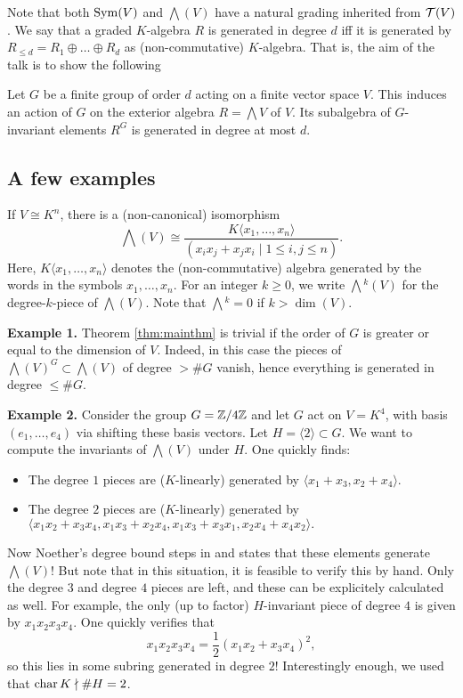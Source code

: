 \documentclass[../main.tex]{subfiles}
\begin{document}
Note that both $\operatorname{Sym}(V)$ and $\bigwedge(V)$ have a natural grading inherited from
$\mathcal{T}(V)$. 
We say that a graded $K$-algebra $R$ is generated in degree $d$ iff it is
generated by $R_{\leq d} = R_1 \oplus \dots \oplus R_d$ as (non-commutative)
$K$-algebra.  That is, the aim of the talk is to show the following 
\begin{thm}\label{thm:mainthm}
    Let $G$ be a finite group of order $d$ acting on a finite vector space $V$.
    This induces an action of $G$ on the exterior algebra $R = \bigwedge V$ of $V$.
    Its subalgebra of $G$-invariant elements $R^G$ is generated in
    degree at most $d$.
\end{thm}

\subsection{A few examples} %
\label{sub:Some examples}
If $V \cong K^n$, there is a (non-canonical) isomorphism
\begin{equation*}
    \bigwedge(V) \cong \frac{K\langle x_1, \dots, x_n \rangle}{(x_i x_j + x_j
    x_i \mid 1 \leq i,j \leq n)}.
\end{equation*}
Here, $K\langle x_1, \dots, x_n \rangle$ denotes the (non-commutative) algebra generated
by the words in the symbols $x_1, \dots, x_n$.
For an integer $k \geq 0$, we write $\bigwedge{}^k(V)$ for the degree-$k$-piece of 
$\bigwedge(V)$. Note that $\bigwedge{}^k = 0$ if $k > \dim(V)$. 

\textbf{Example 1.} Theorem \ref{thm:mainthm} is trivial if the order of $G$ is greater
or equal to the dimension of $V$. Indeed, in this case the pieces of
$\bigwedge(V)^G \subset \bigwedge(V)$ of degree $>\# G$ vanish, hence
everything is generated in degree $\leq \# G$.

\textbf{Example 2.} Consider the group $G = \mathbb{Z}/4\mathbb{Z}$ and let $G$ act on 
$V = K^4$, with basis $(e_1, \dots, e_4)$ via shifting these basis vectors.
Let $H = \langle 2 \rangle \subset G$. We want to compute the invariants of
$\bigwedge(V)$ under $H$. One quickly finds:
\begin{itemize}
    \item The degree $1$ pieces are ($K$-linearly) generated by $\langle x_1 +
        x_3, x_2 + x_4 \rangle$.
    \item The degree $2$ pieces are ($K$-linearly) generated by $\langle x_1
        x_2 + x_3x_4, x_1 x_3 + x_2 x_4, x_1x_3+x_3x_1,  x_2x_4 + x_4x_2
        \rangle.$
\end{itemize}
Now Noether's degree bound steps in and states that these elements generate
$\bigwedge(V)$! But note that in this situation, it is feasible to verify this 
by hand. Only the degree $3$ and degree $4$ pieces are left, and these can be 
explicitely calculated as well. For example, the only (up to factor) 
$H$-invariant piece of degree $4$ is given by $x_1 x_2 x_3 x_4$. One quickly
verifies that 
\begin{equation*}
    x_1 x_2 x_3 x_4 = \frac 12 (x_1 x_2 + x_3 x_4)^2,
\end{equation*}
so this lies in some subring generated in degree $2$! Interestingly enough, we 
used that $\operatorname{char} K \nmid \# H = 2$.
\end{document}
